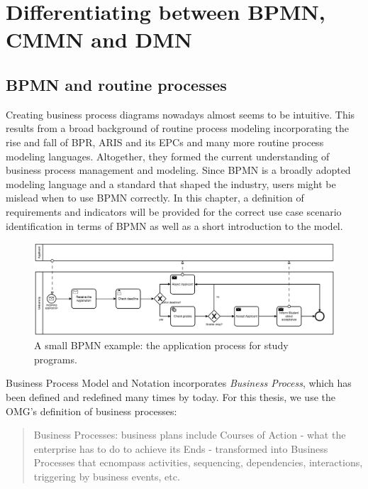 
\chapter{Differentiating between BPMN, CMMN and DMN}
\label{chapter:indicators}

\section{BPMN and routine processes}
Creating business process diagrams nowadays almost seems to be intuitive. This results from a broad background of routine process modeling incorporating the rise and fall of BPR, ARIS and its EPCs and many more routine process modeling languages. Altogether, they formed the current understanding of business process management and modeling. 
Since BPMN is a broadly adopted modeling language and a standard that shaped the industry, users might be mislead when to use BPMN correctly. In this chapter, a definition of requirements and indicators will be provided for the correct use case scenario identification in terms of BPMN as well as a short introduction to the model. 

\begin{figure}

	\centering
	\includegraphics[scale=0.5]{../figures/chapter_indicators/BPMN_Example_Student_Application.png} 
		\caption{A small BPMN example: the application process for study programs.}
	\label{fig:BPMNex}
\end{figure}

Business Process Model and Notation incorporates \textit{Business Process}, which has been defined and redefined many times by today. For this thesis, we use the OMG's definition of business processes: 
\begin{quote}
Business Processes: business plans include Courses of Action - what the enterprise has to do to achieve its Ends - transformed into Business Processes that ecnompass activities, sequencing, dependencies, interactions, triggering by business events, etc. \cite{bmm2015}
\end{quote}


